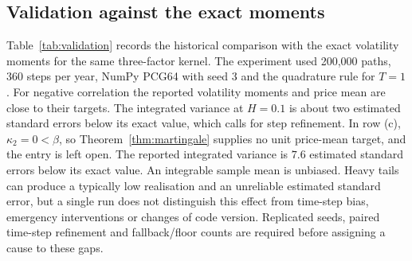 \subsection{Validation against the exact moments}\label{sec:validation}

Table~\ref{tab:validation} records the historical comparison with the exact volatility moments for the same three-factor kernel. The experiment used 200{,}000 paths, 360 steps per year, NumPy PCG64 with seed 3 and the quadrature rule for $T=1$. For negative correlation the reported volatility moments and price mean are close to their targets. The integrated variance at $H=0.1$ is about two estimated standard errors below its exact value, which calls for step refinement. In row (c), $\kappa_2=0<\beta$, so Theorem~\ref{thm:martingale} supplies no unit price-mean target, and the entry is left open. The reported integrated variance is $7.6$ estimated standard errors below its exact value. An integrable sample mean is unbiased. Heavy tails can produce a typically low realisation and an unreliable estimated standard error, but a single run does not distinguish this effect from time-step bias, emergency interventions or changes of code version. Replicated seeds, paired time-step refinement and fallback/floor counts are required before assigning a cause to these gaps.

\begin{table}
\label{tab:validation}
\end{table}

